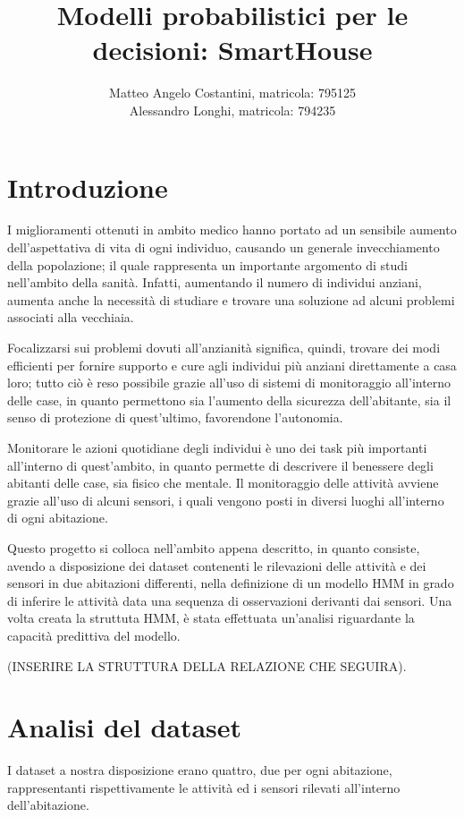 \documentclass[10pt,a4paper]{article}
\title{Modelli probabilistici per le decisioni: SmartHouse}
\author{Matteo Angelo Costantini, matricola: 795125 \\
	Alessandro Longhi, matricola: 794235}
\date{}
\begin{document}
\maketitle
\clearpage
\tableofcontents
\clearpage
\section{Introduzione}
I miglioramenti ottenuti in ambito medico hanno portato ad un sensibile aumento dell'aspettativa di vita di ogni individuo, causando un generale invecchiamento della popolazione; il quale rappresenta un importante argomento di studi nell'ambito della sanità. Infatti, aumentando il numero di individui anziani, aumenta anche la necessità di studiare e trovare una soluzione ad alcuni problemi associati alla vecchiaia.

Focalizzarsi sui problemi dovuti all'anzianità significa, quindi, trovare dei modi efficienti per fornire supporto e cure agli individui più anziani direttamente a casa loro; tutto ciò è reso possibile grazie all'uso di sistemi di monitoraggio all'interno delle case, in quanto permettono sia l'aumento della sicurezza dell'abitante, sia il senso di protezione di quest'ultimo, favorendone l'autonomia.

Monitorare le azioni quotidiane degli individui è uno dei task più importanti all'interno di quest'ambito, in quanto permette di descrivere il benessere degli abitanti delle case, sia fisico che mentale. Il monitoraggio delle attività avviene grazie all'uso di alcuni sensori, i quali vengono posti in diversi luoghi all'interno di ogni abitazione. 

Questo progetto si colloca nell'ambito appena descritto, in quanto consiste, avendo a disposizione dei dataset contenenti le rilevazioni delle attività e dei sensori in due abitazioni differenti, nella definizione di un modello HMM in grado di inferire le attività data una sequenza di osservazioni derivanti dai sensori. Una volta creata la struttuta HMM, è stata effettuata un'analisi riguardante la capacità predittiva del modello.

(INSERIRE LA STRUTTURA DELLA RELAZIONE CHE SEGUIRA). 


\clearpage
\section{Analisi del dataset}
I dataset a nostra disposizione erano quattro, due per ogni abitazione, rappresentanti rispettivamente le attività ed i sensori rilevati all'interno dell'abitazione.
\end{document}
